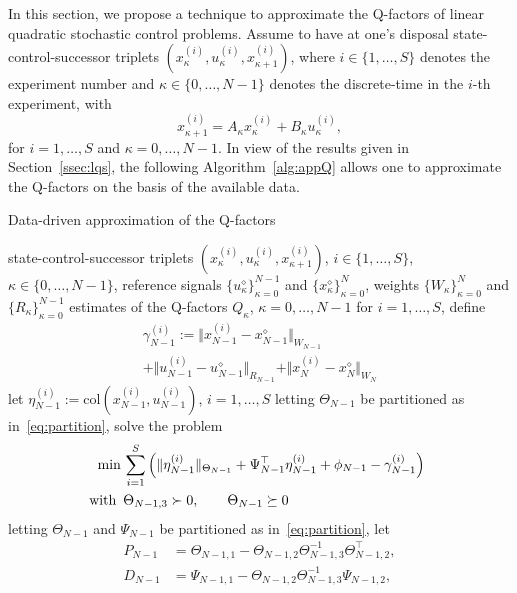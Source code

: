 \documentclass[10pt]{IEEEtran}      %
\newcommand{\col}{\mathrm{col}}
\theoremstyle{theorem}
\theoremstyle{remark}
\begin{document}
In this section, we propose a technique to approximate the Q-factors
of linear quadratic stochastic control problems. Assume to have at one's disposal state-control-successor triplets
$(x_\kappa^{(i)},u_{\kappa}^{(i)},x_{\kappa+1}^{(i)})$, where $i\in\{1,\dots,S\}$ denotes the experiment number and $\kappa\in\{0,\dots,N-1\}$ 
denotes the discrete-time in the $i$-th experiment, with \[x_{\kappa+1}^{(i)}=A_\kappa x_\kappa^{(i)}+B_{\kappa}u_{\kappa}^{(i)},\] for 
$i=1,\dots,S$ and $\kappa=0,\dots,N-1$. In view of the results given in Section~\ref{ssec:lqs}, the following 
Algorithm~\ref{alg:appQ} allows one to approximate the Q-factors on the basis of the available data.
\begin{algorithm}[H]
\caption{Data-driven approximation of the Q-factors\label{alg:appQ}}
\begin{algorithmic}[1]
\REQUIRE state-control-successor triplets $(x_\kappa^{(i)},u_{\kappa}^{(i)},x_{\kappa+1}^{(i)})$, $i\in\{1,\dots,S\}$, 
$\kappa\in\{0,\dots,N-1\}$, reference signals $\{u_\kappa^\diamond\}_{\kappa=0}^{N-1}$ and $\{x_\kappa^\diamond\}_{\kappa=0}^{N}$, weights 
$\{W_\kappa\}_{\kappa=0}^{N}$ and $\{R_\kappa\}_{\kappa=0}^{N-1}$
\ENSURE estimates of the Q-factors $Q_\kappa$, $\kappa=0,\dots,N-1$
\STATE for $i=1,\dots,S$, define
	\begin{multline}\label{eq:gammaN1}
	\gamma_{N-1}^{(i)}:=\Vert x_{N-1}^{(i)}-x_{N-1}^\diamond\Vert_{W_{N-1}}\\+\Vert u_{N-1}^{(i)}-u_{N-1}^\diamond\Vert_{R_{N-1}}
		+\Vert x_{N}^{(i)}-x_{N}^\diamond\Vert_{W_N}
	\end{multline}
\STATE let $\eta_{N-1}^{(i)}:=\col(x_{N-1}^{(i)},u_{N-1}^{(i)})$, $i=1,\dots,S$
\STATE letting $\Theta_{N-1}$ be partitioned as in~\eqref{eq:partition}, solve the problem
	\begin{align}
\hspace{-1ex}	\nonumber \min\,&\sum_{i=1}^{S} \left(\Vert \eta_{N-1}^{(i)} \Vert_{\Theta_{N-1}}
	+\Psi_{N-1}^\top \eta_{N-1}^{(i)} + \phi_{N-1}-\gamma_{N-1}^{(i)}\right)\\
\hspace{-1ex}	\text{with }\,&\Theta_{N-1,3} \succ 0, \qquad \Theta_{N-1} \succeq 0\label{eq:probN1}
		\end{align}
\STATE letting $\Theta_{N-1}$ and $\Psi_{N-1}$ be partitioned as in~\eqref{eq:partition}, let
	 \begin{align*}
	 P_{N-1} & = \Theta_{N-1,1} - \Theta_{N-1,2}\Theta_{N-1,3}^{-1}\Theta_{N-1,2}^\top,\\
	 D_{N-1} & =\Psi_{N-1,1}-\Theta_{N-1,2}\Theta_{N-1,3}^{-1}\Psi_{N-1,2},\\

\end{align*}
\end{algorithmic}
\end{algorithm}
\end{document}
